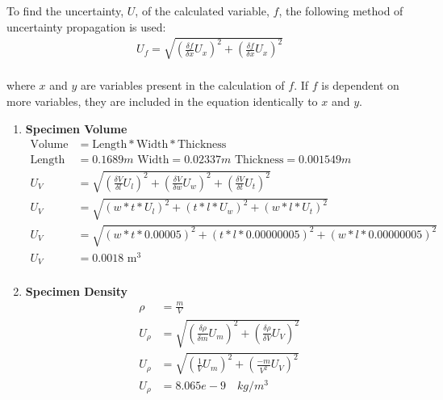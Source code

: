 To find the uncertainty, $U$, of the calculated variable, $f$, the following method of uncertainty propagation is used: 
\begin{align}
    U_{f} = \sqrt{(\frac{\delta f}{\delta x}U_{x})^{2} + (\frac{\delta f}{\delta x}U_{x})^{2}}
\end{align} \\
where $x$ and $y$ are variables present in the calculation of $f$. If $f$ is dependent on more variables, they are included in the equation identically to $x$ and $y$. \\

 \normalsize
 \begin{enumerate}
     \item \textbf{Specimen Volume}
     \vspace{-0.25in}
        \begin{align*}
        \text{Volume} &= \text{Length}*\text{Width}*\text{Thickness} \\
        \text{Length} &= 0.1689 m \text{ Width} = 0.02337 m \text{ Thickness} = 0.001549 m \\
        U_{V} &= \sqrt{(\frac{\delta V}{\delta l}U_{l})^{2} + (\frac{\delta V}{\delta w}U_{w})^{2}+(\frac{\delta V}{\delta t}U_{t})^{2}} \\
        U_{V} &= \sqrt{(w*t*U_{l})^{2} + (t*l*U_{w})^{2} + (w*l*U_{t})^{2} } \\ 
        U_{V} &= \sqrt{(w*t*0.00005)^{2} + (t*l*0.00000005)^{2} + (w*l*0.00000005)^{2} } \\ 
        U_{V} &= 0.0018 \text{ m}^{3} \\ 
        \end{align*}

\item \textbf{Specimen Density}
    \vspace{-0.25in}
    \begin{align*}
        \rho &= \frac{m}{V} \\ 
        U_{\rho} &= \sqrt{(\frac{\delta \rho}{\delta m}U_{m})^{2} + (\frac{\delta \rho}{\delta V}U_{V})^{2}} \\
        U_{\rho} &= \sqrt{(\frac{1}{V}U_{m})^{2} + (\frac{-m}{V^{2}}U_{V})^{2}} \\
        U_{\rho} &= 8.065 e -9 \quad kg/m^{3}
    \end{align*}

\end{enumerate}